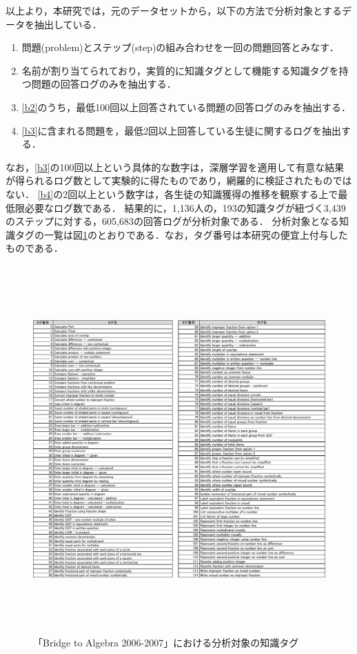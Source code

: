 以上より，本研究では，元のデータセットから，以下の方法で分析対象とするデータを抽出している．
\begin{enumerate}
	\item 問題(problem)とステップ(step)の組み合わせを一回の問題回答とみなす．\label{b1}
	\item 名前が割り当てられており，実質的に知識タグとして機能する知識タグを持つ問題の回答ログのみを抽出する．\label{b2}
	\item \ref{b2}のうち，最低100回以上回答されている問題の回答ログのみを抽出する．\label{b3}
	\item \ref{b3}に含まれる問題を，最低2回以上回答している生徒に関するログを抽出する．\label{b4}
\end{enumerate}

なお，\ref{b3}の100回以上という具体的な数字は，深層学習を適用して有意な結果が得られるログ数として実験的に得たものであり，網羅的に検証されたものではない．
\ref{b4}の2回以上という数字は，各生徒の知識獲得の推移を観察する上で最低限必要なログ数である．
結果的に，1,136人の，193の知識タグが紐づく3,439のステップに対する，605,683の回答ログが分析対象である．
分析対象となる知識タグの一覧は図\ref{fig:kTable3}のとおりである．なお，タグ番号は本研究の便宜上付与したものである．

\begin{figure}[htb]
\begin{center}
\includegraphics[height=400pt]{./img/kTable3.pdf}
\end{center}
\caption{「Bridge to Algebra 2006-2007」における分析対象の知識タグ}
\label{fig:kTable3}
\end{figure}


